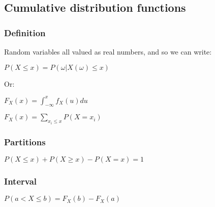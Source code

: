 
\subsection{Cumulative distribution functions}

\subsubsection{Definition}

Random variables all valued as real numbers, and so we can write:

\(P(X\le x)=P({\omega |X(\omega)\le x})\)

Or:

\(F_X(x)=\int_{-\infty}^x f_X(u)du\)

\(F_X(x)=\sum_{x_i\le x}P(X=x_i) \)

\subsubsection{Partitions}

\(P(X\le x)+P(X\ge x)-P(X=x)=1\)

\subsubsection{Interval}

\(P(a< X\le b)=F_X(b)-F_X(a)\)

